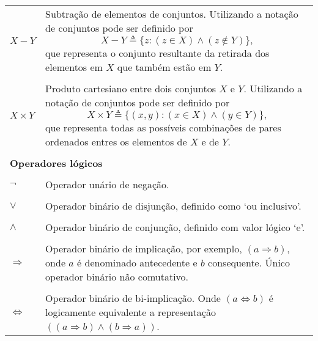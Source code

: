 \begin{longtable}{p{1in}p{4.5in}}
$X - Y$ \dotfill &
Subtração de elementos de conjuntos.
Utilizando a notação de conjuntos pode ser definido por
\begin{equation*}
X - Y \triangleq
    \{z : (z \in X) \wedge (z \notin Y)\}\text{,}
\end{equation*}
que representa o conjunto resultante da retirada dos elementos em $X$ que
também estão em $Y$.
\tabularnewline
\tabularnewline

$X \times Y$ \dotfill &
\index{produto cartesiano}%
Produto cartesiano entre dois conjuntos $X$ e $Y$.
Utilizando a notação de conjuntos pode ser definido por
\begin{equation*}
X \times Y \triangleq
    \{(x,y) : (x \in X) \wedge (y \in Y)\}\text{,}
\end{equation*}
que representa todas as possíveis combinações de pares ordenados entres os
elementos de $X$ e de $Y$.
\tabularnewline
\tabularnewline

\multicolumn{2}{l}{\bf Operadores lógicos}
\tabularnewline
\tabularnewline

$\neg$ \dotfill &
\index{negacao@negação}%
Operador unário de negação.
\tabularnewline
\tabularnewline

$\vee$ \dotfill &
\index{disjuncao@disjunção}%
Operador binário de disjunção, definido como `ou inclusivo'.
\tabularnewline
\tabularnewline

$\wedge$ \dotfill &
\index{conjuncao@conjunção}%
Operador binário de conjunção, definido com valor lógico `e'.
\tabularnewline
\tabularnewline

$\Rightarrow$ \dotfill &
\index{implicacao@implicação}%
Operador binário de implicação, por exemplo, $(a \Rightarrow b)$, onde $a$ é
denominado antecedente e $b$ consequente.
Único operador binário não comutativo.
\tabularnewline
\tabularnewline

$\Leftrightarrow$ \dotfill &
\index{bi-implicacao@bi-implicação}%
Operador binário de bi-implicação.
Onde $(a \Leftrightarrow b)$ é logicamente equivalente a representação
$((a \Rightarrow b) \wedge (b \Rightarrow a))$.

\end{longtable}


